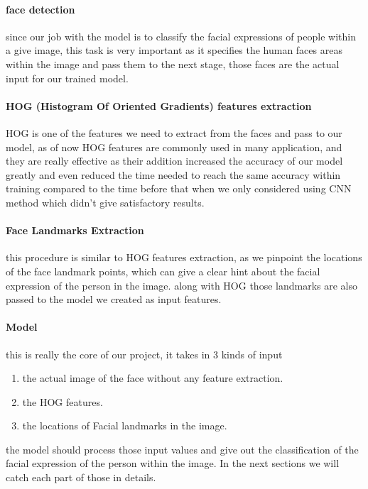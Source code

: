\paragraph{face detection}
since our job with the model is to classify the facial expressions of people within a give image, this task is very important as it specifies the human faces areas within the image and pass them to the next stage, those faces are the actual input for our trained model.

\paragraph{HOG (Histogram Of Oriented Gradients) features extraction}
HOG is one of the features we need to extract from the faces and pass to our model, as of now HOG features are commonly used in many application, and they are really effective as their addition increased the accuracy of our model greatly and even reduced the time needed to reach the same accuracy within training compared to the time before that when we only considered using CNN method which didn't give satisfactory results.

\paragraph{Face Landmarks Extraction}
this procedure is similar to HOG features extraction, as we pinpoint the locations of the face landmark points, which can give a clear hint about the facial expression of the person in the image.\newline
along with HOG those landmarks are also passed to the model we created as input features.

\paragraph{Model}
this is really the core of our project, it takes in 3 kinds of input
\begin{enumerate}
	\item the actual image of the face without any feature extraction.
	\item the HOG features.
	\item the locations of Facial landmarks in the image.
\end{enumerate}
the model should process those input values and give out the classification of the facial expression of the person within the image. 
\newline
In the next sections we will catch each part of those in details.

